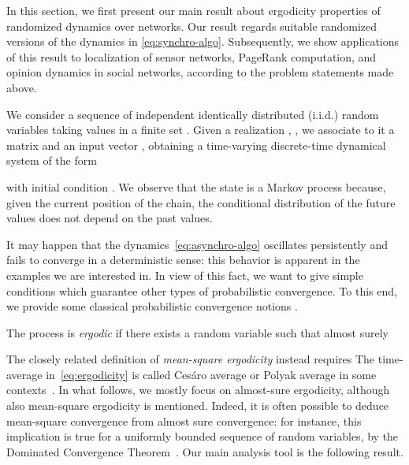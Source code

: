 \documentclass{IEEEtran}
\newcommand{\1}{\mathbf{1}} \newcommand{\ind}{\mathds{1}}
\begin{document}
In this section, we first present our main result about ergodicity properties of randomized dynamics over networks. Our result regards suitable randomized versions of the dynamics in \eqref{eq:synchro-algo}. 
Subsequently, we show applications of this result to localization of sensor networks, PageRank computation, and opinion dynamics in social networks, according to the problem statements made above.

We consider a sequence of independent identically distributed (i.i.d.) random variables  taking values in a finite set .
Given a realization , , we associate to it a matrix  and an input vector , obtaining a time-varying discrete-time dynamical system of the form

with initial condition .
We observe that the state  is a Markov process because, given the current position of the chain, the conditional distribution of the future values does not depend on the past values.

It may happen that the dynamics~\eqref{eq:asynchro-algo} oscillates persistently and fails to converge in a deterministic sense: this behavior is  apparent in the examples we are interested in.
In view of this fact, we want to give simple conditions which guarantee other types of probabilistic convergence. To this end, we provide some classical probabilistic convergence notions \cite{VB:95}.

The process  is {\em ergodic} if there exists a random variable  such that almost surely
 
The closely related definition of {\em{mean-square ergodicity}} instead requires  
The time-average in~\eqref{eq:ergodicity} is called Ces\'aro average or Polyak average in some contexts~\cite{BTP-ABJ:92}.
In what follows, we mostly focus on almost-sure ergodicity, although also mean-square ergodicity is mentioned. Indeed, it is often possible to deduce mean-square convergence from almost sure convergence: for instance, this implication is true for a uniformly bounded sequence of random variables, by the Dominated Convergence Theorem~\cite{VB:95}.
Our main analysis tool is the following result.
\end{document}
